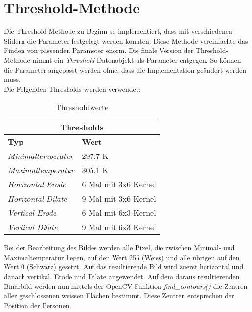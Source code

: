 \section{Threshold-Methode}

Die Threshold-Methode zu Beginn so implementiert, dass mit verschiedenen Slidern die Parameter festgelegt werden konnten. Diese Methode vereinfachte das Finden von passenden Parameter enorm. Die finale Version der Threshold-Methode nimmt ein \textit{Threshold} Datenobjekt als Parameter entgegen. So können die Parameter angepasst werden ohne, dass die Implementation geändert werden muss.\\
Die Folgenden Thresholds wurden verwendet:

{
	\renewcommand{\arraystretch}{1.3}

	\begin{table}[H]
		\scriptsize
		\centering
		\begin{tabularx}{.6\textwidth}{XX}\\
			\multicolumn{2}{c}{\textbf{Thresholds}}\\
			\hline
			\textbf{Typ} & \textbf{Wert}\\
			\hline
			\textit{Minimaltemperatur} & 297.7 K\\
			\hline
			\textit{Maximaltemperatur} & 305.1 K\\
			\hline 
			\textit{Horizontal \gls{Erode}} & 6 Mal mit 3x6 Kernel\\
			\hline
			\textit{Horizontal \gls{Dilate}} & 9 Mal mit 3x6 Kernel\\
			\hline
			\textit{Vertical \gls{Erode}} & 6 Mal mit 6x3 Kernel\\
			\hline
			\textit{Vertical \gls{Dilate}} & 9  Mal mit 6x3 Kernel\\
			\hline
		\end{tabularx}
		\caption{Thresholdwerte}
		\label{tbl:thresholds}
	\end{table}
}

\noindent
Bei der Bearbeitung des Bildes werden alle Pixel, die zwischen Minimal- und Maximaltemperatur liegen, auf den Wert 255 (Weiss) und alle übrigen auf den Wert 0 (Schwarz) gesetzt. Auf das resultierende Bild wird zuerst horizontal und danach vertikal, \gls{Erode} und \gls{Dilate} angewendet. Auf dem daraus resultierenden Binärbild werden nun mittels der OpenCV-Funktion \textit{find\_contours()} die Zentren aller geschlossenen weissen Flächen bestimmt. Diese Zentren entsprechen der Position der Personen.



